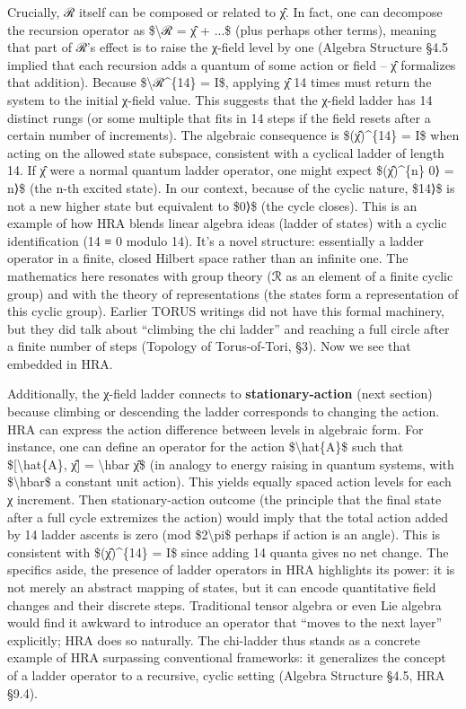 \documentclass[]{article}
\begin{document}
Crucially, ℛ itself can be composed or related to χ̂. In fact, one can
decompose the recursion operator as \$\textbackslash{}ℛ = χ̂ + ...\$
(plus perhaps other terms), meaning that part of ℛ's effect is to raise
the χ-field level by one (Algebra Structure §4.5 implied that each
recursion adds a quantum of some action or field -- χ̂ formalizes that
addition). Because \$\textbackslash{}ℛ\^{}\{14\} = I\$, applying χ̂ 14
times must return the system to the initial χ-field value. This suggests
that the χ-field ladder has 14 distinct rungs (or some multiple that
fits in 14 steps if the field resets after a certain number of
increments). The algebraic consequence is \$(χ̂)\^{}\{14\} = I\$ when
acting on the allowed state subspace, consistent with a cyclical ladder
of length 14. If χ̂ were a normal quantum ladder operator, one might
expect \$(χ̂)\^{}\{n\} \textbar{}0⟩ = \textbar{}n⟩\$ (the n-th excited
state). In our context, because of the cyclic nature, \$\textbar{}14⟩\$
is not a new higher state but equivalent to \$\textbar{}0⟩\$ (the cycle
closes). This is an example of how HRA blends linear algebra ideas
(ladder of states) with a cyclic identification (14 ≡ 0 modulo 14). It's
a novel structure: essentially a ladder operator in a finite, closed
Hilbert space rather than an infinite one. The mathematics here
resonates with group theory (ℛ as an element of a finite cyclic group)
and with the theory of representations (the states form a representation
of this cyclic group). Earlier TORUS writings did not have this formal
machinery, but they did talk about ``climbing the chi ladder'' and
reaching a full circle after a finite number of steps (Topology of
Torus-of-Tori, §3). Now we see that embedded in HRA.

Additionally, the χ-field ladder connects to \textbf{stationary-action}
(next section) because climbing or descending the ladder corresponds to
changing the action. HRA can express the action difference between
levels in algebraic form. For instance, one can define an operator for
the action \$\textbackslash{}hat\{A\}\$ such that
\${[}\textbackslash{}hat\{A\}, χ̂{]} = \textbackslash{}hbar χ̂\$ (in
analogy to energy raising in quantum systems, with
\$\textbackslash{}hbar\$ a constant unit action). This yields equally
spaced action levels for each χ increment. Then stationary-action
outcome (the principle that the final state after a full cycle
extremizes the action) would imply that the total action added by 14
ladder ascents is zero (mod \$2\textbackslash{}pi\$ perhaps if action is
an angle). This is consistent with \$(χ̂)\^{}\{14\} = I\$ since adding 14
quanta gives no net change. The specifics aside, the presence of ladder
operators in HRA highlights its power: it is not merely an abstract
mapping of states, but it can encode quantitative field changes and
their discrete steps. Traditional tensor algebra or even Lie algebra
would find it awkward to introduce an operator that ``moves to the next
layer'' explicitly; HRA does so naturally. The chi-ladder thus stands as
a concrete example of HRA surpassing conventional frameworks: it
generalizes the concept of a ladder operator to a recursive, cyclic
setting (Algebra Structure §4.5, HRA §9.4).
\end{document}
